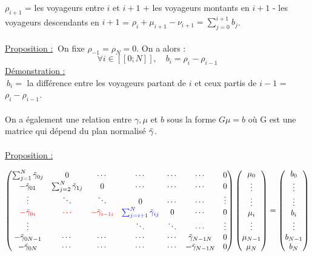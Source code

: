 \documentclass[12pt]{article}
\newcommand{\dcrochetg}{[\![}
\newcommand{\dcrochetd}{]\!]}
\newcommand{\prop}{\underline{Proposition :} }
\newcommand{\demo}{\underline{Démonstration :} }
\begin{document}
\space
$\rho_{i+1}$ = les voyageurs entre $i$ et $i+1$ + les voyageurs montants en $i+1$ - les voyageurs descendants en $i+1$ = $\rho_i + \mu_{i+1} - \nu_{i+1} = \sum^{i+1}_{j=0} b_j$.\\
\\
\prop $\:$On fixe $\rho_{-1} = \rho_N = 0$. On a alors :
\[\forall i \in \dcrochetg0;N\dcrochetd, \quad b_i = \rho_i - \rho_{i-1}\]
\demo \\$\: b_i = $ la différence entre les voyageurs partant de $i$ et ceux partis de $i-1$ = $\rho_i - \rho_{i-1}$.\\
\\
On a également une relation entre $\gamma, \mu$ et $b$ sous la forme $G\mu = b$ où G est une matrice qui dépend du plan normalisé $\Tilde{\gamma}$.\\
\\
\prop\\
\begin{adjustwidth}{-2cm}{-2cm}
\[
\begin{pmatrix}
\sum^N_{j=1} \Tilde{\gamma}_{0j} & 0 & \cdots & \cdots & \cdots & \cdots & 0\\
- \Tilde{\gamma}_{01} & \sum^N_{j=2} \Tilde{\gamma}_{1j} & 0 & \cdots & \cdots & \cdots & 0\\
\vdots & \ddots & \ddots   & 0 &\cdots& \cdots & \vdots  \\
\textcolor{red}{- \Tilde{\gamma}_{0i}} & \textcolor{red}{\cdots} & \textcolor{red}{- \Tilde{\gamma}_{i-1i}} & \textcolor{blue}{\sum^N_{j=i+1} \Tilde{\gamma}_{ij}} & 0 & \cdots & 0 \\
\vdots &  & &  \ddots & \ddots & \cdots  &\vdots \\
- \Tilde{\gamma}_{0N-1} & \cdots & \cdots & \cdots & \cdots & \Tilde{\gamma}_{N-1N} & 0\\
- \Tilde{\gamma}_{0N} & \cdots & \cdots & \cdots  & \cdots & - \Tilde{\gamma}_{N-1N} & 0\\
\end{pmatrix}
\begin{pmatrix}
\mu_0\\
\vdots\\
\vdots\\
\mu_i\\
\vdots\\
\mu_{N-1}\\
\mu_N\\
\end{pmatrix}
=
\begin{pmatrix}
b_0\\
\vdots\\
\vdots\\
b_i\\
\vdots\\
b_{N-1}\\
b_N\\
\end{pmatrix}
\]
\end{adjustwidth}
\end{document}
